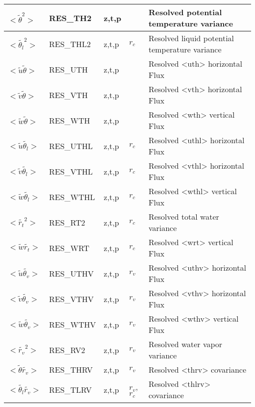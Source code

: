 \begin{longtable}[c]{|p{}|p{}|p{}|p{}|p{}|}
$<\tilde{\theta}^2>$                                 & RES\_TH2   & z,t,p   &       & Resolved potential temperature variance \\\hline
$<\tilde{\theta_l}^2>$                               & RES\_THL2  & z,t,p   & $r_c$ & Resolved liquid potential temperature variance \\\hline
$<\tilde{u}\tilde{\theta}>$                          & RES\_UTH   & z,t,p   &       & Resolved <uth> horizontal Flux \\\hline
$<\tilde{v}\tilde{\theta}>$                          & RES\_VTH   & z,t,p   &       & Resolved <vth> horizontal Flux \\\hline
$<\tilde{w}\tilde{\theta}>$                          & RES\_WTH   & z,t,p   &       & Resolved <wth> vertical Flux \\\hline
$<\tilde{u}\tilde{\theta_l}>$                        & RES\_UTHL  & z,t,p   & $r_c$ & Resolved <uthl> horizontal Flux \\\hline
$<\tilde{v}\tilde{\theta_l}>$                        & RES\_VTHL  & z,t,p   & $r_c$ & Resolved <vthl> horizontal Flux \\\hline
$<\tilde{w}\tilde{\theta_l}>$                        & RES\_WTHL  & z,t,p   & $r_c$ & Resolved <wthl> vertical Flux \\\hline
$<\tilde{r_t}^2>$                                    & RES\_RT2   & z,t,p   & $r_c$ & Resolved total water variance \\\hline
$<\tilde{w}\tilde{r_t}>$                             & RES\_WRT   & z,t,p   & $r_c$ & Resolved <wrt> vertical Flux \\\hline
$<\tilde{u}\tilde{\theta_v}>$                        & RES\_UTHV  & z,t,p   & $r_v$ & Resolved <uthv> horizontal Flux\\\hline
$<\tilde{v}\tilde{\theta_v}>$                        & RES\_VTHV  & z,t,p   & $r_v$ & Resolved <vthv> horizontal Flux\\\hline
$<\tilde{w}\tilde{\theta_v}>$                        & RES\_WTHV  & z,t,p   & $r_v$ & Resolved <wthv> vertical Flux \\\hline
$<\tilde{r_v}^2>$                                    & RES\_RV2   & z,t,p   & $r_v$ & Resolved water vapor variance \\\hline
$<\tilde{\theta}\tilde{r_v}>$                        & RES\_THRV  & z,t,p   & $r_v$ & Resolved <thrv> covariance \\\hline
$<\tilde{\theta_l}\tilde{r_v}>$                      & RES\_TLRV  & z,t,p   & $r_v$, $r_c$ & Resolved <thlrv> covariance \\\hline

\end{longtable}
